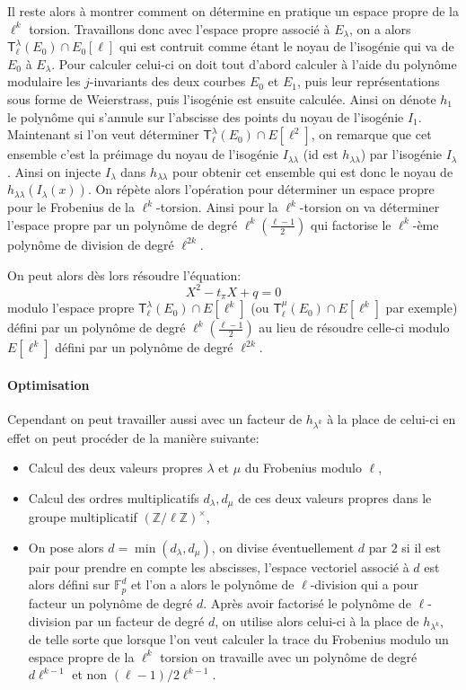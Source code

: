 \documentclass[10pt,a4paper]{book}
\theoremstyle{plain}
\theoremstyle{definition}
\theoremstyle{definition}
\theoremstyle{definition}
\theoremstyle{definition}
\theoremstyle{remark}
\theoremstyle{remark}
\theoremstyle{definition}
\begin{document}
Il reste alors à montrer comment on détermine en pratique un espace propre de la $\ell^k$ torsion. Travaillons donc avec l'espace propre associé à $E_{\lambda}$, on a alors $\mathsf{T}_{\ell}^{\lambda}(E_0) \cap E_0[\ell]$ qui est contruit comme étant le noyau de l'isogénie qui va de $E_0$ à $E_{\lambda}$. Pour calculer celui-ci on doit tout d'abord calculer à l'aide du polynôme modulaire les $j$-invariants des deux courbes $E_0$ et $E_1$, puis leur représentations sous forme de Weierstrass, puis l'isogénie est ensuite calculée. Ainsi on dénote $h_1$ le polynôme qui s'annule sur l'abscisse des points du noyau de l'isogénie $I_1$. 
Maintenant si l'on veut déterminer $\mathsf{T}_{\ell}^{\lambda}(E_0) \cap E[\ell^2]$, on remarque que cet ensemble c'est la préimage du noyau de l'isogénie $I_{\lambda \lambda}$ (id est $h_{\lambda \lambda}$) par l'isogénie $I_{\lambda}$. Ainsi on injecte $I_{\lambda}$ dans $h_{\lambda \lambda}$ pour obtenir cet ensemble qui est donc le noyau de $h_{\lambda \lambda}(I_{\lambda}(x))$. On répète alors l'opération pour déterminer un espace propre pour le Frobenius de la $\ell^k$-torsion. Ainsi pour la $\ell^k$-torsion on va déterminer l'espace propre par un polynôme de degré $\ell^k  (\frac{\ell-1}{2})$ qui factorise le $\ell^k$-ème polynôme de division de degré $\ell^{2k}$.

On peut alors dès lors résoudre l'équation:
\begin{equation*}
X^2-t_{\pi}X+q=0
\end{equation*}
modulo l'espace propre $\mathsf{T}_{\ell}^{\lambda}(E_0) \cap E[\ell^k]$ (ou $\mathsf{T}_{\ell}^{\mu}(E_0) \cap E[\ell^k]$ par exemple) défini par un polynôme de degré $\ell^k  (\frac{\ell-1}{2})$ au lieu de résoudre celle-ci modulo $E[\ell^k]$ défini par un polynôme de degré $\ell^{2k}$.

\paragraph{Optimisation}
Cependant on peut travailler aussi avec un facteur de $h_{\lambda^k}$ à la place de celui-ci en effet on peut procéder de la manière suivante:
\begin{itemize}
\item Calcul des deux valeurs propres $\lambda$ et $\mu$ du Frobenius modulo $\ell$,
\item Calcul des ordres multiplicatifs $d_{\lambda},d_{\mu}$ de ces deux valeurs propres dans le groupe multiplicatif $(\mathbb{Z}/\ell \mathbb{Z})^{\times}$,
\item On pose alors $d=\min(d_{\lambda},d_{\mu})$, on divise éventuellement $d$ par $2$ si il est pair pour prendre en compte les abscisses, l'espace vectoriel associé à $d$ est alors défini sur $\mathbb{F}_p^{d}$ et l'on a alors le polynôme de $\ell$-division qui a pour facteur un polynôme de degré $d$. Après avoir factorisé le polynôme de $\ell$-division par un facteur de degré $d$, on utilise alors celui-ci à la place de $h_{\lambda^{k}}$, de telle sorte que lorsque l'on veut calculer la trace du Frobenius modulo un espace propre de la $\ell^k$ torsion on travaille avec un polynôme de degré $d \ell^{k-1}$ et non $(\ell -1)/2 \ell^{k-1}$.
\end{itemize}
\end{document}
